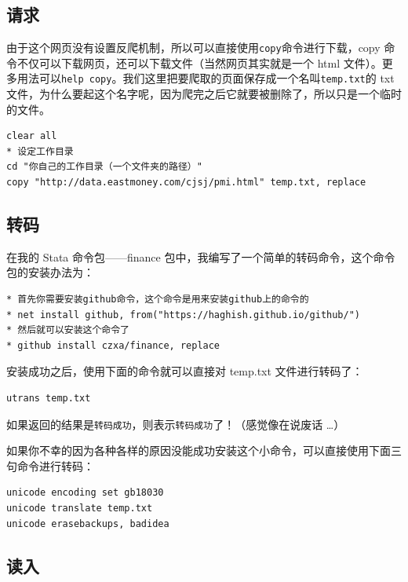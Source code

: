 \documentclass[cn,fancy,blue,11pt]{elegantbook}
\begin{document}
\hypertarget{section-32}{%
\subsection{请求}\label{section-32}}

由于这个网页没有设置反爬机制，所以可以直接使用\lstinline{copy}命令进行下载，copy 命令不仅可以下载网页，还可以下载文件（当然网页其实就是一个 html 文件）。更多用法可以\lstinline{help copy}。我们这里把要爬取的页面保存成一个名叫\lstinline{temp.txt}的 txt 文件，为什么要起这个名字呢，因为爬完之后它就要被删除了，所以只是一个临时的文件。

\begin{lstlisting}
clear all
* 设定工作目录
cd "你自己的工作目录（一个文件夹的路径）"
copy "http://data.eastmoney.com/cjsj/pmi.html" temp.txt, replace
\end{lstlisting}

\hypertarget{section-33}{%
\subsection{转码}\label{section-33}}

在我的 Stata 命令包------finance 包中，我编写了一个简单的转码命令，这个命令包的安装办法为：

\begin{lstlisting}
* 首先你需要安装github命令，这个命令是用来安装github上的命令的
* net install github, from("https://haghish.github.io/github/")
* 然后就可以安装这个命令了
* github install czxa/finance, replace
\end{lstlisting}

安装成功之后，使用下面的命令就可以直接对 temp.txt 文件进行转码了：

\begin{lstlisting}
utrans temp.txt
\end{lstlisting}

如果返回的结果是\lstinline{转码成功}，则表示\lstinline{转码成功}了！（感觉像在说废话 \dots）

如果你不幸的因为各种各样的原因没能成功安装这个小命令，可以直接使用下面三句命令进行转码：

\begin{lstlisting}
unicode encoding set gb18030
unicode translate temp.txt
unicode erasebackups, badidea
\end{lstlisting}

\hypertarget{section-34}{%
\subsection{读入}\label{section-34}}
\end{document}
